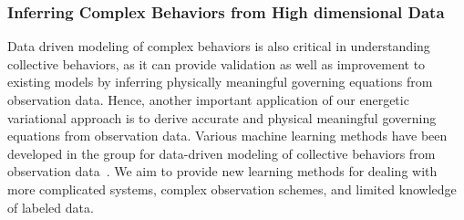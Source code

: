 \documentclass[11pt]{NSFamsart}
\begin{document}
\subsubsection*{Inferring Complex Behaviors from High dimensional Data}
Data driven modeling of complex behaviors is also critical in understanding collective behaviors, as it can provide validation as well as improvement to existing models by inferring physically meaningful governing equations from observation data.  Hence, another important application of our energetic variational approach is to derive accurate and physical meaningful governing equations from observation data.  Various machine learning methods have been developed in the group for data-driven modeling of collective behaviors from observation data~\cite{LZTM2019, ZMM2020, MMQZ2021, FMMZ2022,MTZM2022, ZMM2023}.  We aim to provide new learning methods for dealing with more complicated systems, complex observation schemes, and limited knowledge of labeled data.
\end{document}
